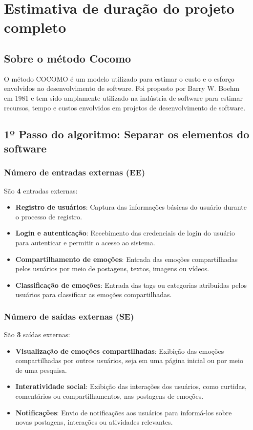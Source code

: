 \documentclass[12pt]{article}
\begin{document}
\section{Estimativa de duração do projeto completo}
\subsection{Sobre o método Cocomo}
  O método COCOMO é um modelo utilizado para estimar o custo e o esforço envolvidos 
  no desenvolvimento de software. Foi proposto por Barry W. Boehm em 1981 e 
  tem sido amplamente utilizado na indústria de software para estimar recursos, 
  tempo e custos envolvidos em projetos de desenvolvimento de software.
\subsection{1º Passo do algoritmo: Separar os elementos do software}
\subsubsection{Número de entradas externas (EE)}
  São \textbf{4} entradas externas:
  \begin{itemize}
    \item \textbf{Registro de usuários}: Captura das informações básicas do usuário durante o processo de registro.
    \item \textbf{Login e autenticação}: Recebimento das credenciais de login do usuário para autenticar e permitir o acesso ao sistema.
    \item \textbf{Compartilhamento de emoções}: Entrada das emoções compartilhadas pelos usuários por meio de postagens, textos, imagens ou vídeos.
    \item \textbf{Classificação de emoções}: Entrada das tags ou categorias atribuídas pelos usuários para classificar as emoções compartilhadas.
  \end{itemize}
\subsubsection{Número de saídas externas (SE)}
  São \textbf{3} saídas externas:
  \begin{itemize}
    \item \textbf{Visualização de emoções compartilhadas}: Exibição das emoções compartilhadas por outros usuários, seja em uma página inicial ou por meio de uma pesquisa.
    \item \textbf{Interatividade social}: Exibição das interações dos usuários, como curtidas, comentários ou compartilhamentos, nas postagens de emoções.
    \item \textbf{Notificações}: Envio de notificações aos usuários para informá-los sobre novas postagens, interações ou atividades relevantes.
  \end{itemize}
\end{document}
